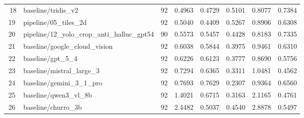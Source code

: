 \begin{table}[htbp]
\begin{tabular}{clcccccc}
$$  18 & baseline/tridis\_v2 & 92 & 0.4963 & 0.4729 & 0.5101 & 0.8077 & 0.7384 \\
  19 & pipeline/05\_tiles\_2d & 92 & 0.5040 & 0.4409 & 0.5267 & 0.8906 & 0.6308 \\
  20 & pipeline/12\_yolo\_crop\_anti\_halluc\_gpt54 & 90 & 0.5573 & 0.5457 & 0.4428 & 0.8183 & 0.7335 \\
  21 & baseline/google\_cloud\_vision & 92 & 0.6038 & 0.5844 & 0.3975 & 0.9461 & 0.6310 \\
  22 & baseline/gpt\_5\_4 & 92 & 0.6226 & 0.6123 & 0.3777 & 0.8690 & 0.5756 \\
  23 & baseline/mistral\_large\_3 & 92 & 0.7294 & 0.6365 & 0.3311 & 1.0481 & 0.4562 \\
  24 & baseline/gemini\_3\_1\_pro & 92 & 0.7693 & 0.7629 & 0.2307 & 0.9364 & 0.6560 \\
  25 & baseline/qwen3\_vl\_8b & 92 & 1.4021 & 0.6715 & 0.3163 & 2.1165 & 0.4761 \\
  26 & baseline/churro\_3b & 92 & 2.4482 & 0.5037 & 0.4540 & 2.8878 & 0.5497 \\
\bottomrule
\end{tabular}
\end{table}
